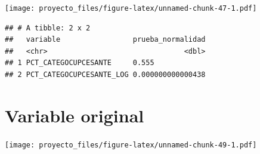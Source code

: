 \documentclass[11pt,]{article}
\newenvironment{Shaded}{\begin{snugshade}}{\end{snugshade}}
\newcommand{\KeywordTok}[1]{\textcolor[rgb]{0.13,0.29,0.53}{\textbf{#1}}}
\newcommand{\DataTypeTok}[1]{\textcolor[rgb]{0.13,0.29,0.53}{#1}}
\newcommand{\DecValTok}[1]{\textcolor[rgb]{0.00,0.00,0.81}{#1}}
\newcommand{\StringTok}[1]{\textcolor[rgb]{0.31,0.60,0.02}{#1}}
\newcommand{\OperatorTok}[1]{\textcolor[rgb]{0.81,0.36,0.00}{\textbf{#1}}}
\newcommand{\NormalTok}[1]{#1}
\begin{document}
\texttt{[image: proyecto\_files/figure-latex/unnamed-chunk-47-1.pdf]}

\begin{Shaded}
\end{Shaded}

\begin{verbatim}
## # A tibble: 2 x 2
##   variable                 prueba_normalidad
##   <chr>                                <dbl>
## 1 PCT_CATEGOCUPCESANTE     0.555            
## 2 PCT_CATEGOCUPCESANTE_LOG 0.000000000000438
\end{verbatim}

\section{Variable original}\label{variable-original}

\begin{Shaded}
\end{Shaded}

\texttt{[image: proyecto\_files/figure-latex/unnamed-chunk-49-1.pdf]}

\begin{Shaded}
\end{Shaded}
\end{document}
